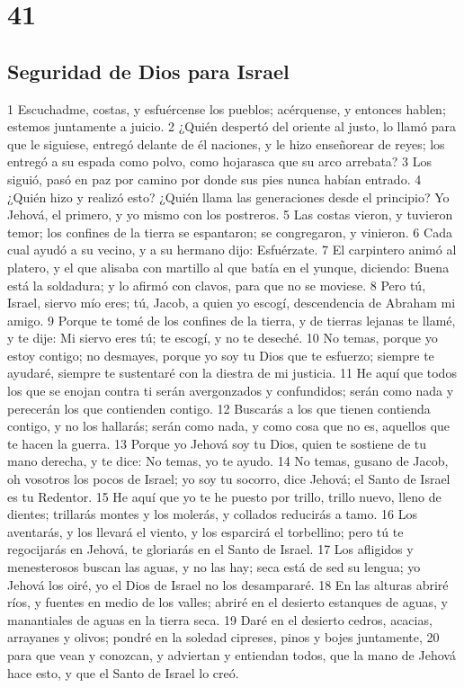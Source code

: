 \chapter{41}

\section*{Seguridad de Dios para Israel}

1 Escuchadme, costas, y esfuércense los pueblos; acérquense, y entonces hablen; estemos juntamente a juicio.
2 ¿Quién despertó del oriente al justo, lo llamó para que le siguiese, entregó delante de él naciones, y le hizo enseñorear de reyes; los entregó a su espada como polvo, como hojarasca que su arco arrebata?
3 Los siguió, pasó en paz por camino por donde sus pies nunca habían entrado.
4 ¿Quién hizo y realizó esto? ¿Quién llama las generaciones desde el principio? Yo Jehová, el primero, y yo mismo con los postreros.
5 Las costas vieron, y tuvieron temor; los confines de la tierra se espantaron; se congregaron, y vinieron.
6 Cada cual ayudó a su vecino, y a su hermano dijo: Esfuérzate.
7 El carpintero animó al platero, y el que alisaba con martillo al que batía en el yunque, diciendo: Buena está la soldadura; y lo afirmó con clavos, para que no se moviese.
8 Pero tú, Israel, siervo mío eres; tú, Jacob, a quien yo escogí, descendencia de Abraham mi amigo. 
9 Porque te tomé de los confines de la tierra, y de tierras lejanas te llamé, y te dije: Mi siervo eres tú; te escogí, y no te deseché.
10 No temas, porque yo estoy contigo; no desmayes, porque yo soy tu Dios que te esfuerzo; siempre te ayudaré, siempre te sustentaré con la diestra de mi justicia.
11 He aquí que todos los que se enojan contra ti serán avergonzados y confundidos; serán como nada y perecerán los que contienden contigo.
12 Buscarás a los que tienen contienda contigo, y no los hallarás; serán como nada, y como cosa que no es, aquellos que te hacen la guerra.
13 Porque yo Jehová soy tu Dios, quien te sostiene de tu mano derecha, y te dice: No temas, yo te ayudo.
14 No temas, gusano de Jacob, oh vosotros los pocos de Israel; yo soy tu socorro, dice Jehová; el Santo de Israel es tu Redentor.
15 He aquí que yo te he puesto por trillo, trillo nuevo, lleno de dientes; trillarás montes y los molerás, y collados reducirás a tamo.
16 Los aventarás, y los llevará el viento, y los esparcirá el torbellino; pero tú te regocijarás en Jehová, te gloriarás en el Santo de Israel.
17 Los afligidos y menesterosos buscan las aguas, y no las hay; seca está de sed su lengua; yo Jehová los oiré, yo el Dios de Israel no los desampararé.
18 En las alturas abriré ríos, y fuentes en medio de los valles; abriré en el desierto estanques de aguas, y manantiales de aguas en la tierra seca.
19 Daré en el desierto cedros, acacias, arrayanes y olivos; pondré en la soledad cipreses, pinos y bojes juntamente,
20 para que vean y conozcan, y adviertan y entiendan todos, que la mano de Jehová hace esto, y que el Santo de Israel lo creó.

